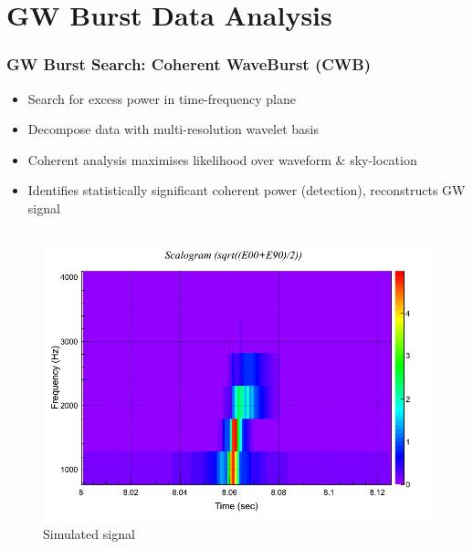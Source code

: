 \documentclass[serif,mathserif,10pt]{beamer}
\let\oldframetitle\frametitle%
\renewcommand{\frametitle}[1]{%
      \oldframetitle{#1}\setstretch{1.2}}
\begin{document}
\section{GW Burst Data Analysis}

\begin{frame}
    \frametitle{GW Burst Search: Coherent WaveBurst (CWB)}
    \begin{itemize}
        \item Search for excess power in time-frequency plane
        \item Decompose data with multi-resolution wavelet basis
        \item Coherent analysis maximises likelihood over waveform \&
            sky-location
        \item Identifies statistically significant coherent power (detection),
            reconstructs GW signal
    \end{itemize}

    \begin{columns}


        \begin{center}
            \vspace{-0.1cm}
            \begin{figure}
                \includegraphics[width=0.7\columnwidth]{figures/L1_wf_white_inj_tf.png}
                \caption{Simulated signal}
            \end{figure}
        \end{center}



\end{columns}
\end{frame}
\end{document}
